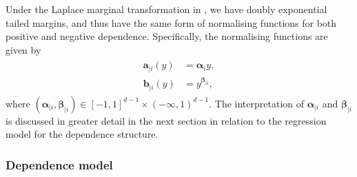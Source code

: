 \documentclass{article}
\numberwithin{equation}{section}
\begin{document}
Under the Laplace marginal transformation in \citet{Keef2013}, we have doubly exponential tailed margins, and thus have the same form of normalising functions for both positive and negative dependence.
Specifically, the normalising functions are given by
\begin{align} \label{eq:laplace_normalisation}
  \begin{split}
    \bm{a}_{\mid i}(y) &= \bm{\alpha}_i y, \\
    \bm{b}_{\mid i}(y) &= y^{\bm{\beta}_{\mid i}}, 
  \end{split}
\end{align}
where $(\bm{\alpha}_{\mid i}, \bm{\beta}_{\mid i}) \in [-1, 1]^{d-1} \times (-\infty, 1)^{d-1}$. %
The interpretation of $\bm{\alpha}_{\mid i}$ and $\bm{\beta}_{\mid i}$ is discussed in greater detail in the next section in relation to the regression model for the dependence structure.

\subsubsection{Dependence model} \label{subsubsec:dep_model}

\end{document}
